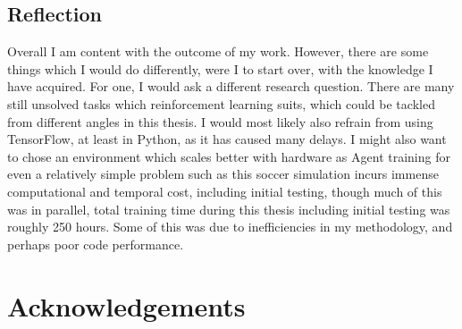 \section{Reflection}
Overall I am content with the outcome of my work. However, there are some things which I would do differently, were I to start over, with the knowledge I have acquired. For one, I would ask a different research question. There are many still unsolved tasks which reinforcement learning suits, which could be tackled from different angles in this thesis. I would most likely also refrain from using TensorFlow, at least in Python, as it has caused many delays. I might also want to chose an environment which scales better with hardware as Agent training for even a relatively simple problem such as this soccer simulation incurs immense computational and temporal cost, including initial testing, though much of this was in parallel, total training time during this thesis including initial testing was roughly 250 hours. Some of this was due to inefficiencies in my methodology, and perhaps poor code performance. 

\chapter{Acknowledgements}





